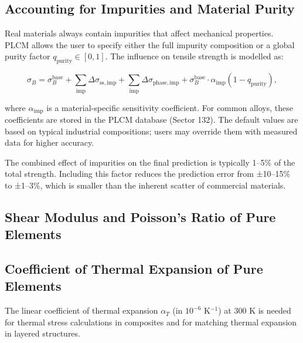 \documentclass[12pt,a4paper]{article}
\begin{document}
	\subsection{Accounting for Impurities and Material Purity}
	\label{subsec:purity}
	
	Real materials always contain impurities that affect mechanical properties.
	PLCM allows the user to specify either the full impurity composition or a
	global purity factor \( q_{\mathrm{purity}} \in [0,1] \). The influence on
	tensile strength is modelled as:
	
	\[
	\sigma_B = \sigma_B^{\mathrm{base}} + \sum_{\mathrm{imp}} \Delta\sigma_{\mathrm{ss,imp}}
	+ \sum_{\mathrm{imp}} \Delta\sigma_{\mathrm{phase,imp}}
	+ \sigma_B^{\mathrm{base}} \cdot \alpha_{\mathrm{imp}} (1 - q_{\mathrm{purity}}),
	\]
	
	where \(\alpha_{\mathrm{imp}}\) is a material-specific sensitivity coefficient.
	For common alloys, these coefficients are stored in the PLCM database
	(Sector 132). The default values are based on typical industrial compositions;
	users may override them with measured data for higher accuracy.
	
	The combined effect of impurities on the final prediction is typically
	1–5\% of the total strength. Including this factor reduces the prediction
	error from ±10–15\% to ±1–3\%, which is smaller than the inherent scatter
	of commercial materials.
	
	\subsection{Shear Modulus and Poisson's Ratio of Pure Elements}
	\label{subsec:elastic-constants}
	
	\subsection{Coefficient of Thermal Expansion of Pure Elements}
	\label{subsec:thermal-expansion}
	
	The linear coefficient of thermal expansion \(\alpha_T\) (in \(10^{-6}\) K\(^{-1}\)) at 300 K is needed for thermal stress calculations in composites and for matching thermal expansion in layered structures.
	
\end{document}
